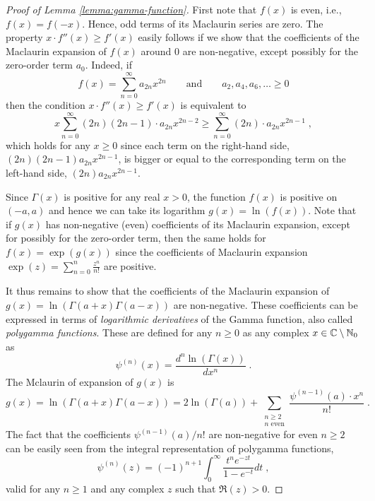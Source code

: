 \begin{proof}[Proof of Lemma \ref{lemma:gamma-function}]
First note that $f(x)$ is even, i.e., $f(x) = f(-x)$. Hence, odd terms of its
Maclaurin series are zero. The property $x \cdot f''(x) \ge f'(x)$ easily
follows if we show that the coefficients of the Maclaurin expansion of $f(x)$
around $0$ are non-negative, except possibly for the zero-order term $a_0$.
Indeed, if
$$
f(x) = \sum_{n=0}^\infty a_{2n} x^{2n} \qquad \text{and} \qquad a_2, a_4, a_6, \dots \ge 0
$$
then the condition $x \cdot f''(x) \ge f'(x)$ is equivalent to
$$
x \sum_{n=0}^\infty (2n)(2n-1) \cdot a_{2n} x^{2n-2} \ge \sum_{n=0}^\infty (2n) \cdot a_{2n} x^{2n-1} \; ,
$$
which holds for any $x \ge 0$ since each term on the right-hand side,
$(2n)(2n-1) a_{2n} x^{2n-1}$, is bigger or equal to the corresponding term on
the left-hand side, $(2n) a_{2n} x^{2n-1}$.

Since $\Gamma(x)$ is positive for any real $x > 0$, the function $f(x)$ is
positive on $(-a,a)$ and hence we can take its logarithm $g(x) = \ln(f(x))$.
Note that if $g(x)$ has non-negative (even) coefficients of its Maclaurin
expansion, except for possibly for the zero-order term, then the same holds for
$f(x) = \exp(g(x))$ since the coefficients of Maclaurin expansion $\exp(z) =
\sum_{n=0}^n \frac{z^n}{n!}$ are positive.

It thus remains to show that the coefficients of the Maclaurin expansion of
$g(x) = \ln(\Gamma(a+x) \Gamma(a-x))$ are non-negative. These coefficients can
be expressed in terms of \emph{logarithmic derivatives} of the Gamma function,
also called \emph{polygamma functions}. These are defined for any $n \ge 0$ as
any complex $x \in \mathbb{C} \setminus \mathbb{N}_{0}$ as
$$
\psi^{(n)}(x) = \frac{d^n\ln(\Gamma(x))}{dx^n} \; .
$$
The Mclaurin of expansion of $g(x)$ is
$$
g(x)
= \ln \left( \Gamma(a+x) \Gamma(a-x) \right)
= 2 \ln(\Gamma(a)) + \sum_{\substack{n \ge 2 \\ \text{$n$ even}}} \frac{\psi^{(n-1)}(a) \cdot x^n}{n!} \; .
$$
The fact that the coefficients $\psi^{(n-1)}(a)/n!$ are non-negative for even $n
\ge 2$ can be easily seen from the integral representation of polygamma
functions,
$$
\psi^{(n)}(z) = (-1)^{n+1} \int_0^\infty \frac{t^n e^{-zt}}{1-e^{-t}} dt \; ,
$$
valid for any $n \ge 1$ and any complex $z$ such that $\Re(z) > 0$.
\end{proof}

